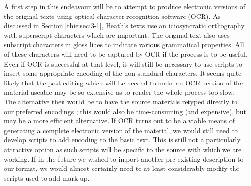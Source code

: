 A first step in this endeavour will be to attempt to produce electronic versions of the original texts using optical character recognition software (OCR). As discussed in Section \ref{thie:sec:3-1}, Heath's texts use an idiosyncratic orthography with superscript characters which are important. The original text also uses subscript characters in gloss lines to indicate various grammatical properties. All of these characters will need to be captured by OCR if the process is to be useful. Even if OCR is successful at that level, it will still be necessary to use scripts to insert some appropriate encoding of the non-standard characters. It seems quite likely that the post-editing which will be needed to make an OCR version of the material useable may be so extensive as to render the whole process too slow. The alternative then would be to have the source materials retyped directly to our preferred encodings%
%
; this would also be time-consuming (and expensive), but may be a more efficient alternative. If OCR turns out to be a viable means of generating a complete electronic version of the material, we would still need to develop scripts to add encoding to the basic text. This is still not a particularly attractive option as such scripts will be specific to the source with which we are working. If in the future we wished to import another pre-existing description to our format, we would almost certainly need to at least considerably modify the scripts used to add mark-up.

